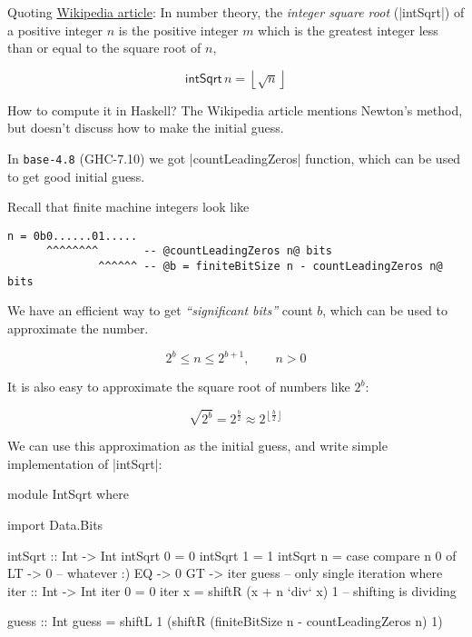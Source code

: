 Quoting \href{https://en.wikipedia.org/wiki/Integer_square_root}{Wikipedia article}: 
In number theory, the \emph{integer square root} (|intSqrt|) of a positive integer $n$ is the positive integer $m$ which is the greatest integer less than or equal to the square root of $n$,

\begin{equation*}
\mathsf{intSqrt}\, n = \left\lfloor \sqrt{n} \right\rfloor
\end{equation*}

How to compute it in Haskell?
The Wikipedia article mentions Newton's method, but doesn't discuss how to 
make the initial guess.

In \texttt{base-4.8} (GHC-7.10) we got |countLeadingZeros| function,
which can be used to get good initial guess.

Recall that finite machine integers look like
\begin{verbatim}
n = 0b0......01.....
      ^^^^^^^^       -- @countLeadingZeros n@ bits
              ^^^^^^ -- @b = finiteBitSize n - countLeadingZeros n@ bits 
\end{verbatim}

We have an efficient way to get \emph{``significant bits''} count $b$,
which can be used to approximate the number.

\begin{equation*}
2^b \le n \le 2^{b+1}, \qquad n > 0
\end{equation*}

It is also easy to approximate the square root of numbers like $2^b$:

\begin{equation*}
\sqrt{2^b} = 2^{\frac{b}{2}} \approx 2^{\left\lfloor \frac{b}{2} \right\rfloor}
\end{equation*}

We can use this approximation as the initial guess,
and write simple implementation of |intSqrt|:

\begin{code}
module IntSqrt where

import Data.Bits

intSqrt :: Int -> Int
intSqrt 0 = 0
intSqrt 1 = 1
intSqrt n = case compare n 0 of
    LT -> 0           -- whatever :)
    EQ -> 0
    GT -> iter guess  -- only single iteration
  where
    iter :: Int -> Int
    iter 0 = 0
    iter x = shiftR (x + n `div` x) 1 -- shifting is dividing

    guess :: Int
    guess = shiftL 1 (shiftR (finiteBitSize n - countLeadingZeros n) 1)
\end{code}

